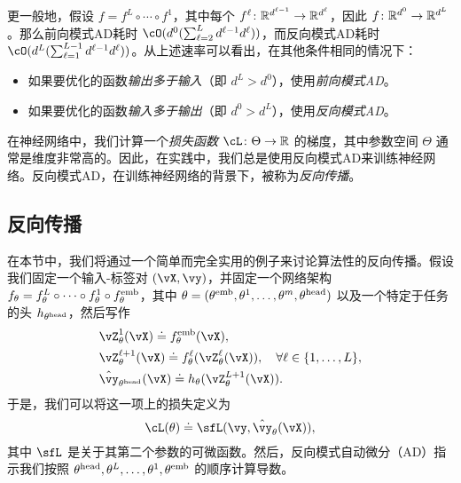 \documentclass[../../book-main.tex]{subfiles}
\begin{document}
更一般地，假设 \(f = f^{L} \circ \cdots \circ f^{1}\)，其中每个 \(f^{\ell} \colon \mathbb{R}^{d^{\ell - 1}} \to \mathbb{R}^{d^{\ell}}\)，因此 \(f \colon \mathbb{R}^{d^{0}} \to \mathbb{R}^{d^{L}}\)。那么前向模式AD耗时 \(\cO(d^{0}(\sum_{\ell = 2}^{L}d^{\ell - 1}d^{\ell}))\)，而反向模式AD耗时 \(\cO(d^{L}(\sum_{\ell = 1}^{L - 1}d^{\ell - 1}d^{\ell}))\)。从上述速率可以看出，在其他条件相同的情况下：
\begin{itemize}
    \item 如果要优化的函数\textit{输出多于输入}（即 \(d^{L} > d^{0}\)），使用\textit{前向模式AD}。
    \item 如果要优化的函数\textit{输入多于输出}（即 \(d^{0} > d^{L}\)），使用\textit{反向模式AD}。
\end{itemize}
在神经网络中，我们计算一个\textit{损失函数} \(\cL \colon \Theta \to \R\) 的梯度，其中参数空间 \(\Theta\) 通常是维度非常高的。因此，在实践中，我们总是使用反向模式AD来训练神经网络。反向模式AD，在训练神经网络的背景下，被称为\textit{反向传播}。

\subsection{反向传播}
\label{app:BP-section}
在本节中，我们将通过一个简单而完全实用的例子来讨论算法性的反向传播。假设我们固定一个输入-标签对 \((\vX, \vy)\)，并固定一个网络架构 \(f_{\theta} = f_{\theta}^{L} \circ \cdots \circ f_{\theta}^{1} \circ f_{\theta}^{\mathrm{emb}}\)，其中 \(\theta = (\theta^{\mathrm{emb}}, \theta^{1}, \dots, \theta^{m}, \theta^{\mathrm{head}})\) 以及一个特定于任务的头 \(h_{\theta^{\mathrm{head}}}\)，然后写作
\begin{align}
    &\vZ_{\theta}^{1}(\vX) \doteq f_{\theta}^{\emb}(\vX), \\ 
    &\vZ_{\theta}^{\ell + 1}(\vX) \doteq f_{\theta}^{\ell}(\vZ_{\theta}^{\ell}(\vX)), \quad \forall \ell \in \{1, \dots, L\}, \\
    &\hat{\vy}_{\theta^{\head}}(\vX) \doteq h_{\theta}(\vZ_{\theta}^{L+1}(\vX)).
\end{align}
于是，我们可以将这一项上的损失定义为
\begin{equation}
    \cL(\theta) \doteq \sfL(\vy, \hat{\vy}_{\theta}(\vX)),
\end{equation}
其中 \(\sfL\) 是关于其第二个参数的可微函数。然后，反向模式自动微分（AD）指示我们按照 \(\theta^{\mathrm{head}}, \theta^{L}, \dots, \theta^{1}, \theta^{\mathrm{emb}}\) 的顺序计算导数。
\end{document}
